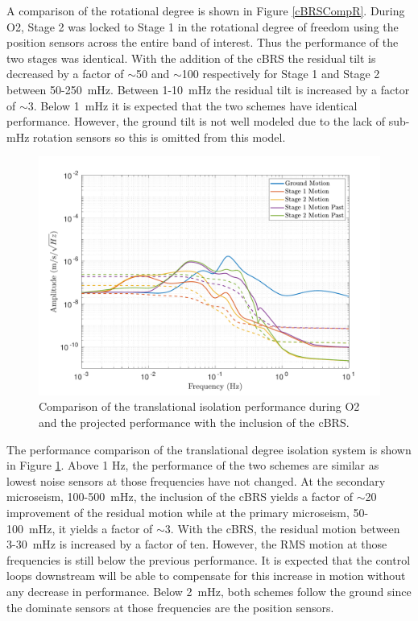 \documentclass [12pt, proquest]{uwthesis}[2019]
\begin{document}
A comparison of the rotational degree is shown in Figure \ref{cBRSCompR}. During O2, Stage 2 was locked to Stage 1 in the rotational degree of freedom using the position sensors across the entire band of interest. Thus the performance of the two stages was identical. With the addition of the cBRS the residual tilt is decreased by a factor of $\sim$50 and $\sim$100 respectively for Stage 1 and Stage 2 between 50-250~mHz. Between 1-10~mHz the residual tilt is increased by a factor of $\sim$3. Below 1~mHz it is expected that the two schemes have identical performance. However, the ground tilt is not well modeled due to the lack of sub-mHz rotation sensors so this is omitted from this model.


\begin{figure}[!h]
\begin{center}
\includegraphics[width=\textwidth]{cBRS_Model_CompX.pdf}
\caption[Comparison of the translational isolation performance during O2 and the projected performance with the inclusion of the cBRS]{Comparison of the translational isolation performance during O2 and the projected performance with the inclusion of the cBRS.}
\label{cBRSCompX}
\end{center}
\end{figure}

The performance comparison of the translational degree isolation system is shown in Figure \ref{cBRSCompX}. Above 1 Hz, the performance of the two schemes are similar as lowest noise sensors at those frequencies have not changed. At the secondary microseism, 100-500~mHz, the inclusion of the cBRS yields a factor of $\sim$20 improvement of the residual motion while at the primary microseism, 50-100~mHz, it yields a factor of $\sim$3. With the cBRS, the residual motion between 3-30~mHz is increased by a factor of ten. However, the RMS motion at those frequencies is still below the previous performance. It is expected that the control loops downstream will be able to compensate for this increase in motion without any decrease in performance. Below 2~mHz, both schemes follow the ground since the dominate sensors at those frequencies are the position sensors.
\end{document}
